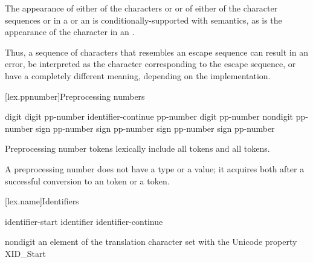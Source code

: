 \pnum
The appearance of either of the characters  or \tcode{\textbackslash} or of
either of the character sequences \tcode{/*} or \tcode{//} in a
 or an 
is conditionally-supported with  semantics, as is the appearance of the character
 in an .
\begin{footnote}
Thus, a sequence of characters
that resembles an escape sequence can result in an error, be interpreted as the
character corresponding to the escape sequence, or have a completely different meaning,
depending on the implementation.
\end{footnote}

[lex.ppnumber]{Preprocessing numbers}

%
\begin{bnf}
\br
    digit\br
     digit\br
    pp-number identifier-continue\br
    pp-number  digit\br
    pp-number  nondigit\br
    pp-number  sign\br
    pp-number  sign\br
    pp-number  sign\br
    pp-number  sign\br
    pp-number 
\end{bnf}

\pnum
Preprocessing number tokens lexically include
all  tokens and
all  tokens.

\pnum
A preprocessing number does not have a type or a value; it acquires both
after a successful conversion to
an  token or
a  token.%

[lex.name]{Identifiers}

%
\begin{bnf}
\br
    identifier-start\br
    identifier identifier-continue
\end{bnf}

\begin{bnf}
\br
    nondigit\br
    \textnormal{an element of the translation character set with the Unicode property XID_Start}
\end{bnf}

